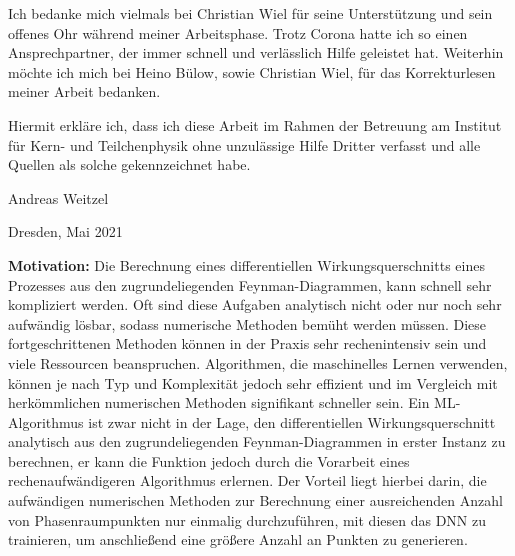 Ich bedanke mich vielmals bei Christian Wiel für seine Unterstützung und sein offenes Ohr während meiner Arbeitsphase. Trotz Corona hatte ich so einen Ansprechpartner, der immer schnell und verlässlich Hilfe geleistet hat. Weiterhin möchte ich mich bei Heino Bülow, sowie Christian Wiel, für das Korrekturlesen meiner Arbeit bedanken.
\clearpage
\thispagestyle{empty}
\vspace*{1.5em}

Hiermit erkläre ich, dass ich diese Arbeit im Rahmen der Betreuung am Institut
für Kern- und Teilchenphysik ohne unzulässige Hilfe Dritter verfasst und alle Quellen als solche gekennzeichnet habe.

\vspace*{45em}

Andreas Weitzel \par
Dresden, Mai 2021


\textbf{Motivation:}
Die Berechnung eines differentiellen Wirkungsquerschnitts eines Prozesses aus den zugrundeliegenden Feynman-Diagrammen, kann schnell sehr kompliziert werden. Oft sind diese Aufgaben analytisch nicht oder nur noch sehr aufwändig lösbar, sodass numerische Methoden bemüht werden müssen. Diese fortgeschrittenen Methoden können in der Praxis sehr rechenintensiv sein und viele Ressourcen beanspruchen. Algorithmen, die maschinelles Lernen verwenden, können je nach Typ und Komplexität jedoch sehr effizient und im Vergleich mit herkömmlichen numerischen Methoden signifikant schneller sein. Ein ML-Algorithmus ist zwar nicht in der Lage, den differentiellen Wirkungsquerschnitt analytisch aus den zugrundeliegenden Feynman-Diagrammen in erster Instanz zu berechnen, er kann die Funktion jedoch durch die Vorarbeit eines rechenaufwändigeren Algorithmus erlernen. Der Vorteil liegt hierbei darin, die aufwändigen numerischen Methoden zur Berechnung einer ausreichenden Anzahl von Phasenraumpunkten nur einmalig durchzuführen, mit diesen das DNN zu trainieren, um anschließend eine größere Anzahl an Punkten zu generieren.

